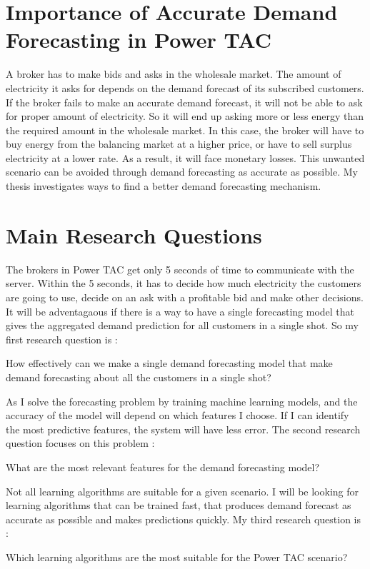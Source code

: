 \section{Importance of Accurate Demand Forecasting in Power TAC}
A broker has to make bids and asks in the wholesale market. The amount of electricity it asks for depends on the demand forecast of its subscribed customers. If the broker fails to make an accurate demand forecast, it will not be able to ask for proper amount of electricity. So it will end up asking more or less energy than the required amount in the wholesale market. In this case, the broker will have to buy energy from the balancing market at a higher price, or have to sell surplus electricity at a lower rate. As a result, it will face monetary losses. This unwanted scenario can be avoided through demand forecasting as accurate as possible. My thesis investigates ways to find a better demand forecasting mechanism.

\section{Main Research Questions}
The brokers in Power TAC get only 5 seconds of time to communicate with the server. Within the 5 seconds, it has to decide how much electricity the customers are going to use, decide on an ask with a profitable bid and make other decisions. It will be adventagaous if there is a way to have a single forecasting model that gives the aggregated demand prediction for all customers in a single shot. So my first research question is : 
\begin{displayquote}
How effectively can we make a single demand forecasting model that make demand forecasting about all the customers in a single shot?
\end{displayquote}

As I solve the forecasting problem by training machine learning models, and the accuracy of the model will depend on which features I choose. If I can identify the most predictive features, the system will have less error. The second research question focuses on this problem :
\begin{displayquote}
What are the most relevant features for the demand forecasting model?
\end{displayquote}

Not all learning algorithms are suitable for a given scenario. I will be looking for learning algorithms that can be trained fast, that produces demand forecast as accurate as possible and makes predictions quickly. My third research question is :
\begin{displayquote}
Which learning algorithms are the most suitable for the Power TAC scenario?
\end{displayquote}

